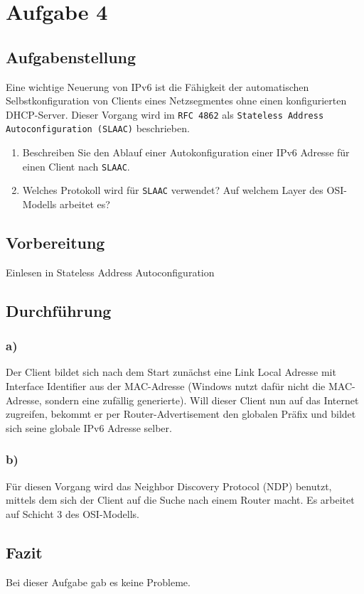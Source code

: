 \newpage

\section{Aufgabe 4}

\subsection{Aufgabenstellung}
Eine wichtige Neuerung von IPv6 ist die Fähigkeit der automatischen Selbstkonfiguration von Clients eines Netzsegmentes ohne einen konfigurierten DHCP-Server. Dieser Vorgang wird im \texttt{RFC 4862} als \texttt{Stateless Address Autoconfiguration (SLAAC)} beschrieben.

\begin{enumerate}[label=(\alph*)]
	\item Beschreiben Sie den Ablauf einer Autokonfiguration einer IPv6 Adresse für einen Client nach \texttt{SLAAC}.
	\item Welches Protokoll wird für \texttt{SLAAC} verwendet? Auf welchem Layer des OSI-Modells arbeitet es?
\end{enumerate}

\subsection{Vorbereitung}
Einlesen in Stateless Address Autoconfiguration

\subsection{Durchführung}
\subsubsection{a)}
Der Client bildet sich nach dem Start zunächst eine Link Local Adresse mit Interface Identifier aus der MAC-Adresse (Windows nutzt dafür nicht die MAC-Adresse, sondern eine zufällig generierte). Will dieser Client nun auf das Internet zugreifen, bekommt er per Router-Advertisement den globalen Präfix und bildet sich seine globale IPv6 Adresse selber.

\subsubsection{b)}
Für diesen Vorgang wird das Neighbor Discovery Protocol (NDP) benutzt, mittels dem sich der Client auf die Suche nach einem Router macht. Es arbeitet auf Schicht 3 des OSI-Modells.
\subsection{Fazit}
Bei dieser Aufgabe gab es keine Probleme.
